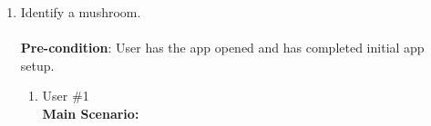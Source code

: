 \documentclass{article}
\begin{document}
\begin{enumerate}[{\bf BE1.}]
	\item Identify a mushroom. \\
	\\
	\textbf{Pre-condition}: User has the app opened and has completed initial app setup. 
		\begin{enumerate}[{\bf VP1.}]
			\item User \#1 \\
				\textbf{Main Scenario:}
				\begin{enumerate}[1.]
					

\end{enumerate}
\end{enumerate}
\end{enumerate}
\end{document}
